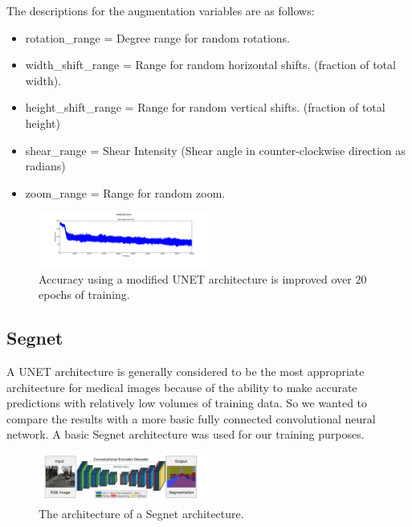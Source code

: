 \documentclass[letterpaper]{article}
\begin{document}
The descriptions for the augmentation variables are as follows:

\begin{itemize}
  \item rotation\_range = Degree range for random rotations.
  \item width\_shift\_range =  Range for random horizontal shifts. (fraction of total width). 
  \item height\_shift\_range = Range for random vertical shifts. (fraction of total height)
  \item shear\_range = Shear Intensity (Shear angle in counter-clockwise direction as radians)
  \item zoom\_range = Range for random zoom.
\end{itemize}


 \begin{figure}[H]
  \centerline{\includegraphics[width=0.5\textwidth]{Plots/AverageErrorKullEvery5000.png}}
  \caption{Accuracy using a modified UNET architecture is improved over 20 epochs of training.}
  \label{fig:trainingovertime2.}
\end{figure}

\subsection{Segnet}
A UNET architecture is generally considered to be the most appropriate architecture for medical images because of the ability to make accurate predictions with relatively low volumes of training data. So we wanted to compare the results with a more basic fully connected convolutional neural network. A basic Segnet architecture was used for our training purposes. 

 \begin{figure}[H]
  \centerline{\includegraphics[width=0.5\textwidth]{Images/SegNetArchitecture.png}}
  \caption{The architecture of a Segnet architecture.}
  \label{fig:segnet}
\end{figure}
\end{document}
